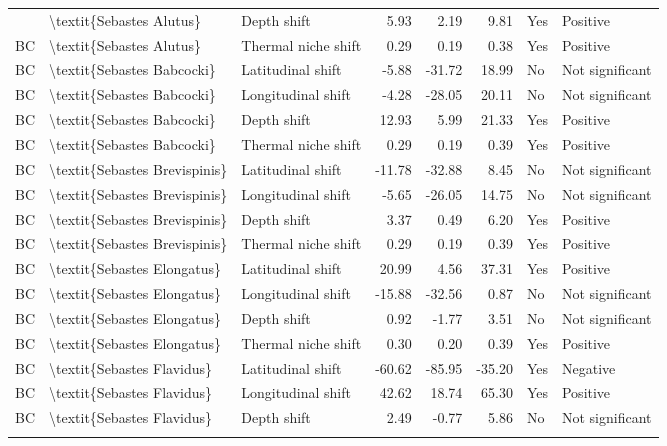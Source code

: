 \begin{longtable}[t]{lllrrrll}
{{BC & \textbackslash{}textit\{Sebastes Alutus\} & Depth shift & 5.93 & 2.19 & 9.81 & Yes & Positive\\
BC & \textbackslash{}textit\{Sebastes Alutus\} & Thermal niche shift & 0.29 & 0.19 & 0.38 & Yes & Positive\\
BC & \textbackslash{}textit\{Sebastes Babcocki\} & Latitudinal shift & -5.88 & -31.72 & 18.99 & No & Not significant\\
\addlinespace
BC & \textbackslash{}textit\{Sebastes Babcocki\} & Longitudinal shift & -4.28 & -28.05 & 20.11 & No & Not significant\\
BC & \textbackslash{}textit\{Sebastes Babcocki\} & Depth shift & 12.93 & 5.99 & 21.33 & Yes & Positive\\
BC & \textbackslash{}textit\{Sebastes Babcocki\} & Thermal niche shift & 0.29 & 0.19 & 0.39 & Yes & Positive\\
BC & \textbackslash{}textit\{Sebastes Brevispinis\} & Latitudinal shift & -11.78 & -32.88 & 8.45 & No & Not significant\\
BC & \textbackslash{}textit\{Sebastes Brevispinis\} & Longitudinal shift & -5.65 & -26.05 & 14.75 & No & Not significant\\
\addlinespace
BC & \textbackslash{}textit\{Sebastes Brevispinis\} & Depth shift & 3.37 & 0.49 & 6.20 & Yes & Positive\\
BC & \textbackslash{}textit\{Sebastes Brevispinis\} & Thermal niche shift & 0.29 & 0.19 & 0.39 & Yes & Positive\\
BC & \textbackslash{}textit\{Sebastes Elongatus\} & Latitudinal shift & 20.99 & 4.56 & 37.31 & Yes & Positive\\
BC & \textbackslash{}textit\{Sebastes Elongatus\} & Longitudinal shift & -15.88 & -32.56 & 0.87 & No & Not significant\\
BC & \textbackslash{}textit\{Sebastes Elongatus\} & Depth shift & 0.92 & -1.77 & 3.51 & No & Not significant\\
\addlinespace
BC & \textbackslash{}textit\{Sebastes Elongatus\} & Thermal niche shift & 0.30 & 0.20 & 0.39 & Yes & Positive\\
BC & \textbackslash{}textit\{Sebastes Flavidus\} & Latitudinal shift & -60.62 & -85.95 & -35.20 & Yes & Negative\\
BC & \textbackslash{}textit\{Sebastes Flavidus\} & Longitudinal shift & 42.62 & 18.74 & 65.30 & Yes & Positive\\
BC & \textbackslash{}textit\{Sebastes Flavidus\} & Depth shift & 2.49 & -0.77 & 5.86 & No & Not significant\\
}}
\end{longtable}
